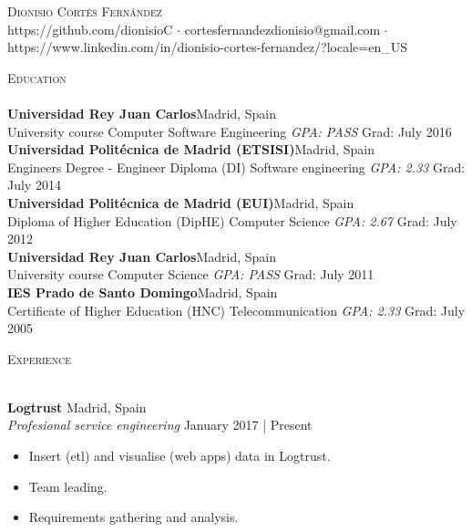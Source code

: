\documentclass[a4paper]{article}
\newcommand{\lineunder} {
    \vspace*{-8pt} \\
    \hspace*{-18pt} \hrulefill \\
}
\newcommand{\header} [1] {
    {\hspace*{-18pt}\vspace*{6pt} \textsc{#1}}
    \vspace*{-6pt} \lineunder
}
\begin{document}
\vspace*{-40pt}

\vspace*{-10pt}
\begin{center}
	{\Huge \scshape {Dionisio Cort\'es Fern\'andez}}\\
	https://github.com/dionisioC $\cdot$ cortesfernandezdionisio@gmail.com $\cdot$ https://www.linkedin.com/in/dionisio-cortes-fernandez/?locale=en\_US\\
\end{center}

\vspace*{2mm}

\header{Education}
\textbf{Universidad Rey Juan Carlos}\hfill Madrid, Spain\\
University course Computer Software Engineering \textit{GPA: PASS} \hfill Grad: July 2016\\
\vspace{2mm}
\textbf{Universidad Polit\'ecnica de Madrid (ETSISI)}\hfill Madrid, Spain\\
Engineer\textquotesingle s Degree  - Engineer Diploma (DI) Software engineering \textit{GPA: 2.33} \hfill Grad: July 2014\\
\vspace{2mm}
\textbf{Universidad Polit\'ecnica de Madrid (EUI)}\hfill Madrid, Spain\\
Diploma of Higher Education (DipHE) Computer Science \textit{GPA: 2.67} \hfill Grad: July 2012\\
\vspace{2mm}
\textbf{Universidad Rey Juan Carlos}\hfill Madrid, Spain\\
University course Computer Science \textit{GPA: PASS} \hfill Grad: July 2011\\
\vspace{2mm}
\textbf{IES Prado de Santo Domingo}\hfill Madrid, Spain\\
Certificate of Higher Education (HNC) Telecommunication \textit{GPA: 2.33} \hfill Grad: July 2005\\
\vspace{2mm}

\vspace*{2mm}

\header{Experience}
\vspace{1mm}

\textbf{Logtrust} \hfill Madrid, Spain\\
\textit{Profesional service engineering} \hfill January 2017 | Present\\
\vspace{-1mm}
\begin{itemize} \itemsep 1pt
	\item Insert (etl) and visualise (web apps) data in Logtrust.
	\item Team leading.
	\item Requirements gathering and analysis.
\end{itemize}
\end{document}
